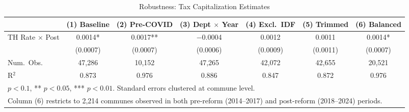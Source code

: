 \begin{table}[htbp]
\centering
\caption{Robustness: Tax Capitalization Estimates}
\label{tab:robustness}
\begin{adjustbox}{max width=\textwidth}
\begin{tabular}{lcccccc}
\toprule
 & (1) Baseline & (2) Pre-COVID & (3) Dept $\times$ Year & (4) Excl.\ IDF & (5) Trimmed & (6) Balanced \\
\midrule
TH Rate $\times$ Post & 0.0014* & 0.0017** & $-$0.0004 & 0.0012 & 0.0011 & 0.0014* \\
 & (0.0007) & (0.0007) & (0.0006) & (0.0009) & (0.0011) & (0.0007) \\
\midrule
Num.\ Obs. & 47,286 & 10,152 & 47,265 & 42,072 & 42,655 & 20,521 \\
R$^2$ & 0.873 & 0.976 & 0.886 & 0.847 & 0.872 & 0.976 \\
\bottomrule
\multicolumn{7}{l}{\footnotesize * $p < 0.1$, ** $p < 0.05$, *** $p < 0.01$. Standard errors clustered at commune level.} \\
\multicolumn{7}{l}{\footnotesize Column (6) restricts to 2,214 communes observed in both pre-reform (2014--2017) and post-reform (2018--2024) periods.}
\end{tabular}
\end{adjustbox}
\end{table}
